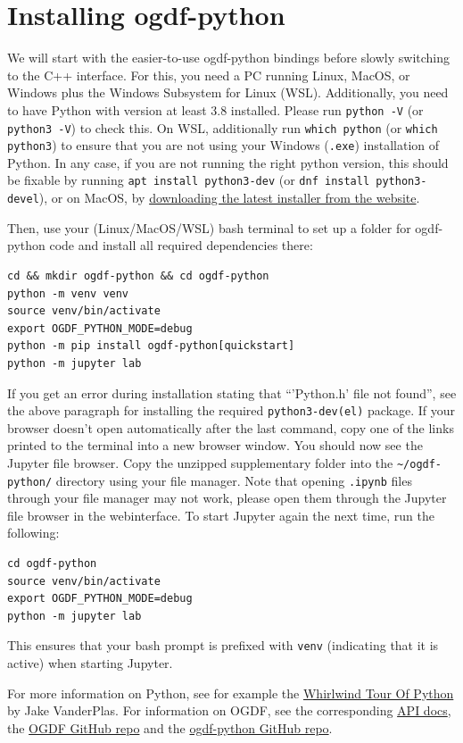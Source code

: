 \documentclass{article}
\begin{document}
\section{Installing ogdf-python}
We will start with the easier-to-use ogdf-python bindings before slowly switching to the C++ interface.
For this, you need a PC running Linux, MacOS, or Windows plus the Windows Subsystem for Linux (WSL).
Additionally, you need to have Python with version at least 3.8 installed.
Please run \texttt{python -V} (or \texttt{python3 -V}) to check this.
On WSL, additionally run \texttt{which python} (or \texttt{which python3}) to ensure that you are not using your Windows (\texttt{.exe}) installation of Python.
In any case, if you are not running the right python version, this should be fixable by running \texttt{apt install python3-dev} (or \texttt{dnf install python3-devel}), or on MacOS, by \href{https://www.python.org/downloads/macos/}{downloading the latest installer from the website}.

Then, use your (Linux/MacOS/WSL) bash terminal to set up a folder for ogdf-python code and install all required dependencies there:
\begin{lstlisting}
cd && mkdir ogdf-python && cd ogdf-python
python -m venv venv
source venv/bin/activate
export OGDF_PYTHON_MODE=debug
python -m pip install ogdf-python[quickstart]
python -m jupyter lab
\end{lstlisting}
If you get an error during installation stating that ``'Python.h' file not found'', see the above paragraph for installing the required \texttt{python3-dev(el)} package.
If your browser doesn't open automatically after the last command, copy one of the links printed to the terminal into a new browser window.
You should now see the Jupyter file browser.
Copy the unzipped supplementary folder into the \texttt{\textasciitilde/ogdf-python/} directory using your file manager.
Note that opening \texttt{.ipynb} files through your file manager may not work, please open them through the Jupyter file browser in the webinterface.
To start Jupyter again the next time, run the following:
\begin{lstlisting}
cd ogdf-python
source venv/bin/activate
export OGDF_PYTHON_MODE=debug
python -m jupyter lab
\end{lstlisting}
This ensures that your bash prompt is prefixed with \texttt{venv} (indicating that it is active) when starting Jupyter.

For more information on Python, see for example the \href{https://jakevdp.github.io/WhirlwindTourOfPython/}{Whirlwind Tour Of Python} by Jake VanderPlas.
For information on OGDF, see the corresponding \href{https://ogdf.github.io/doc/ogdf/}{API docs}, the \href{https://github.com/ogdf/ogdf/}{OGDF GitHub repo} and the \href{https://github.com/ogdf/ogdf-python}{ogdf-python GitHub repo}.
\end{document}
